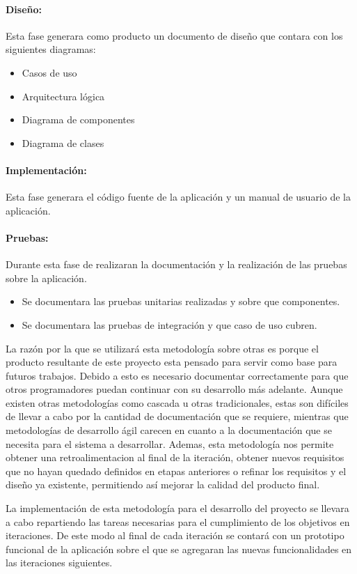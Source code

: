 \documentclass[11pt,letterpaper]{article}
\begin{document}
\paragraph{Diseño:} Esta fase generara como producto un documento de diseño que contara con los siguientes diagramas:
\begin{itemize}
	\item Casos de uso
	\item Arquitectura lógica
	\item Diagrama de componentes
	\item Diagrama de clases
\end{itemize}
\paragraph{Implementación:} Esta fase generara el código fuente de la aplicación y un manual de usuario de la aplicación.
\paragraph{Pruebas:} Durante esta fase de realizaran la documentación y la realización de las pruebas sobre la aplicación.
\begin{itemize}
	\item Se documentara las pruebas unitarias realizadas y sobre que componentes.
	\item Se documentara las pruebas de integración y que caso de uso cubren.
\end{itemize}

La razón por la que se utilizará esta metodología sobre otras es porque el producto resultante de este proyecto esta pensado para servir como base para futuros trabajos. Debido a esto es necesario documentar correctamente para que otros programadores puedan continuar con su desarrollo más adelante. Aunque existen otras metodologías como cascada u otras tradicionales, estas son difíciles de llevar a cabo por la cantidad de documentación que se requiere, mientras que metodologías de desarrollo ágil carecen en cuanto a la documentación que se necesita para el sistema a desarrollar. Ademas, esta metodología nos permite obtener una retroalimentacion al final de la iteración, obtener nuevos requisitos que no hayan quedado definidos en etapas anteriores o refinar los requisitos y el diseño ya existente, permitiendo así mejorar la calidad del producto final.

La implementación de esta metodología para el desarrollo del proyecto se llevara a cabo repartiendo las tareas necesarias para el cumplimiento de los objetivos en iteraciones. De este modo al final de cada iteración se contará con un prototipo funcional de la aplicación sobre el que se agregaran las nuevas funcionalidades en las iteraciones siguientes.
\end{document}
